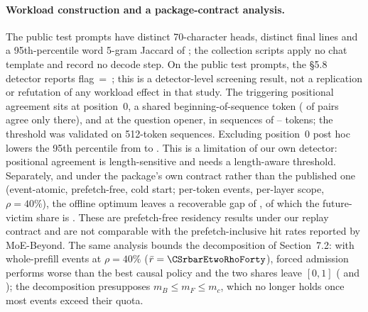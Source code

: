 \paragraph{Workload construction and a package-contract analysis.}
The \CStestPrompts{} public test prompts have \CSheadsDistinct{} distinct
70-character heads, \CSfinalsDistinct{} distinct final lines and a 95th-percentile
word 5-gram Jaccard of \CSpromptJaccardPninetyfive{}; the collection scripts
apply no chat template and record no decode step. On the public test prompts, the \S5.8 detector reports
flag~=~\CSdetectorFlag{}; this is a detector-level screening result, not a
replication or refutation of any workload effect in that study. The triggering
positional agreement sits at position~0, a shared beginning-of-sequence token
(\CSonlyBosShare{} of pairs agree only there), and at the question opener, in
sequences of \CSlenMin{}--\CSlenMax{} tokens; the threshold was validated on
512-token sequences. Excluding position~0 post hoc lowers the 95th percentile
from \CSposAgreePninetyfive{} to \CSposAgreeNoBosPninetyfive{}. This is a
limitation of our own detector: positional agreement is length-sensitive and
needs a length-aware threshold.
Separately, and under the package's own contract rather than the published one
(event-atomic, prefetch-free, cold start; per-token events, per-layer scope,
$\rho = 40\%$), the offline optimum leaves a recoverable gap of \CSgapRhoForty{},
of which the future-victim share is \CSfvShareRhoForty{}. These are
prefetch-free residency results under our replay contract and are not comparable
with the prefetch-inclusive hit rates reported by MoE-Beyond. The same analysis
bounds the decomposition of Section~7.2: with whole-prefill events at
$\rho = 40\%$ ($\bar r = \CSrbarEtwoRhoForty$), forced admission performs worse
than the best causal policy and the two shares leave $[0,1]$ (\CSadmShareBreak{}
and \CSfvShareBreak{}); the decomposition presupposes $m_B \le m_F \le m_c$,
which no longer holds once most events exceed their quota.

